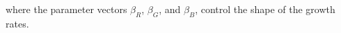 \documentclass[11pt, oneside]{article}
\begin{document}
where the parameter vectors $\beta_R$, $\beta_G$, and $\beta_B$, control the shape of the growth rates.



% 


\end{document}
